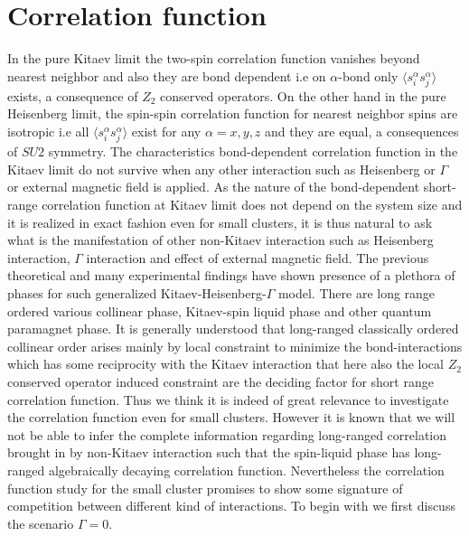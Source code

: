 \documentclass[aps,amsmath,twocolumn,amssymb,floatfix,showpacs,superscriptaddress,nofootinbib,longbibliography]{revtex4-1}
\begin{document}
\section{Correlation function}
\label{correlation}

In the pure Kitaev limit the two-spin correlation function vanishes beyond nearest neighbor and also they are bond dependent i.e on $\alpha$-bond only $\langle s^{\alpha}_i s^{\alpha}_j \rangle$ exists, a consequence of $Z_2$ conserved operators. On the other hand in the pure Heisenberg limit, the spin-spin correlation function for nearest neighbor spins are isotropic i.e all $\langle s^{\alpha}_i s^{\alpha}_j \rangle$ exist for any $\alpha=x,y,z$ and they are equal, a consequences of $SU2$ symmetry. The characteristics bond-dependent correlation function in the Kitaev limit do not survive when  any other interaction such as Heisenberg or $\Gamma$ or external magnetic field is applied. As the nature of the bond-dependent short-range correlation function at Kitaev limit does not depend on the system size and it is realized in  exact fashion even for small clusters, it is thus natural to ask what is the manifestation of other non-Kitaev interaction such as Heisenberg interaction, $\Gamma$ interaction and effect of external magnetic field. The previous theoretical and many experimental findings have shown presence of a plethora of phases for such generalized Kitaev-Heisenberg-$\Gamma$ model\cite{khwang-2022,feng-2022,han-li-2023,yilmaz-2022,shuyi-2023,smit-2020,kimchi-2014,yamaji-2016,young-baek-kim-2015,wang-2021}. There are  long range ordered various collinear phase, Kitaev-spin liquid phase and other quantum paramagnet phase. It is generally understood that long-ranged classically ordered collinear order arises mainly by local constraint to minimize the bond-interactions which has some reciprocity with the Kitaev interaction that here also the local $Z_2$ conserved operator induced constraint are the deciding factor for short range correlation function. Thus we think it is indeed of great relevance to investigate the correlation function even for small clusters. However it is known that we will not be able to infer the complete information regarding long-ranged correlation brought in by non-Kitaev interaction such that the spin-liquid phase has long-ranged algebraically decaying correlation function.  Nevertheless the correlation function study for the small cluster promises to show some signature of competition between different kind of interactions. To begin with we first discuss the scenario $\Gamma=0$.  \\ 
\indent
\end{document}
